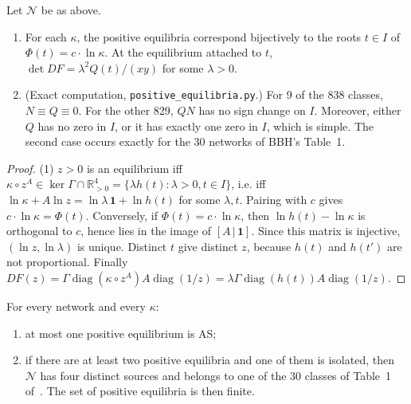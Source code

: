\documentclass[11pt,a4paper]{report}
\providecommand{\R}{\mathbb{R}}
\newcommand{\Net}{\mathcal{N}}
\begin{document}
\begin{proposition}\label{prop:four}
Let \(\Net\) be as above.
\begin{enumerate}
\item For each \(\kappa\), the positive equilibria correspond bijectively to the roots \(t\in I\) of
\(\Phi(t)=c\cdot\ln\kappa\). At the equilibrium attached to \(t\), \(\det DF=\lambda^2Q(t)/(xy)\) for some
\(\lambda>0\).
\item (Exact computation, \texttt{positive\_equilibria.py}.) For 9 of the 838 classes, \(N\equiv Q\equiv0\). For the
other 829, \(QN\) has no sign change on \(I\). Moreover, either \(Q\) has no zero in \(I\), or it has exactly one zero
in \(I\), which is simple. The second case occurs exactly for the 30 networks of BBH's Table~1.
\end{enumerate}
\end{proposition}

\begin{proof}
(1) \(z>0\) is an equilibrium iff \(\kappa\circ z^A\in\ker\Gamma\cap\R^4_{>0}=\{\lambda h(t):\lambda>0,t\in I\}\),
i.e. iff \(\ln\kappa+A\ln z=\ln\lambda\,\mathbf 1+\ln h(t)\) for some \(\lambda,t\). Pairing with \(c\) gives
\(c\cdot\ln\kappa=\Phi(t)\). Conversely, if \(\Phi(t)=c\cdot\ln\kappa\), then \(\ln h(t)-\ln\kappa\) is orthogonal to
\(c\), hence lies in the image of \([A\,|\,\mathbf1]\). Since this matrix is injective, \((\ln z,\ln\lambda)\) is
unique. Distinct \(t\) give distinct \(z\), because \(h(t)\) and \(h(t')\) are not proportional. Finally
\(DF(z)=\Gamma\operatorname{diag}(\kappa\circ z^A)A\operatorname{diag}(1/z)=\lambda\Gamma\operatorname{diag}(h(t))A
\operatorname{diag}(1/z)\).
\end{proof}

\begin{corollary}\label{cor:pos}
For every network and every \(\kappa\):
\begin{enumerate}
\item at most one positive equilibrium is AS;
\item if there are at least two positive equilibria and one of them is isolated, then \(\Net\) has four distinct
sources and belongs to one of the 30 classes of Table~1 of~\autocite{BBH2024}. The set of positive equilibria is then
finite.
\end{enumerate}
\end{corollary}
\end{document}
